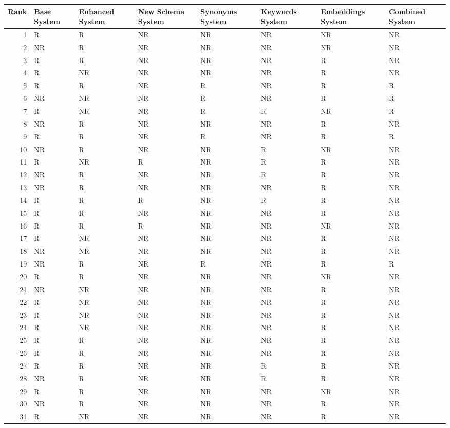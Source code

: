 \begin{tabular}{rlllllll}
\toprule
Rank & Base System & Enhanced System & New Schema System & Synonyms System & Keywords System & Embeddings System & Combined System \\
\midrule
1 & R & R & NR & NR & NR & NR & NR \\
2 & NR & R & NR & NR & NR & NR & NR \\
3 & R & R & NR & NR & NR & R & NR \\
4 & R & NR & NR & NR & NR & R & NR \\
5 & R & R & NR & R & NR & R & R \\
6 & NR & NR & NR & R & NR & R & R \\
7 & R & NR & NR & R & R & NR & R \\
8 & NR & R & NR & NR & NR & R & NR \\
9 & R & R & NR & R & NR & R & R \\
10 & NR & R & NR & NR & R & NR & NR \\
11 & R & NR & R & NR & R & R & NR \\
12 & NR & R & NR & NR & R & R & NR \\
13 & NR & R & NR & NR & NR & R & NR \\
14 & R & R & R & NR & R & R & NR \\
15 & R & R & NR & NR & NR & R & NR \\
16 & R & R & R & NR & NR & NR & NR \\
17 & R & NR & NR & NR & NR & R & NR \\
18 & NR & NR & NR & NR & NR & R & NR \\
19 & NR & R & NR & R & NR & R & R \\
20 & R & R & NR & NR & NR & NR & NR \\
21 & NR & NR & NR & NR & NR & R & NR \\
22 & R & NR & NR & NR & NR & R & NR \\
23 & R & NR & NR & NR & NR & R & NR \\
24 & R & NR & NR & NR & NR & R & NR \\
25 & R & R & NR & NR & NR & R & NR \\
26 & R & R & NR & NR & NR & R & NR \\
27 & R & R & NR & NR & R & R & NR \\
28 & NR & R & NR & NR & R & R & NR \\
29 & R & R & NR & NR & NR & NR & NR \\
30 & NR & R & NR & NR & NR & R & NR \\
31 & R & NR & NR & NR & NR & R & NR \\

\end{tabular}
